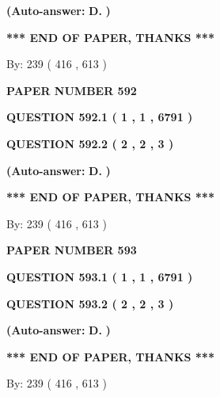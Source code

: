\documentclass[12pt]{article}
\begin{document}
 
{\textbf{(Auto-answer:}}
{\textbf{\large{
D.}}}
{\textbf{)}}
 
 
   
   
   
   
\vspace{1.0in} 
{\textbf{\large{ *** END OF PAPER, THANKS *** }}} 
   
   
\hspace{1.0in} By: 
 239 ( 416 ,  613 )
   
   
   
   
\newpage 
\setcounter{page}{ 
   592001 } 
   
   
 {\textbf{ \Large{ PAPER NUMBER  592  }}}
   
   
   
   
  
  
{\textbf{\large{QUESTION
592.1 
 ( 1 , 1 , 6791 )
}}}
  
  
{\textbf{\large{QUESTION
592.2 
 ( 2 , 2 , 3 )
}}}
 
 
{\textbf{(Auto-answer:}}
{\textbf{\large{
D.}}}
{\textbf{)}}
 
 
   
   
   
   
\vspace{1.0in} 
{\textbf{\large{ *** END OF PAPER, THANKS *** }}} 
   
   
\hspace{1.0in} By: 
 239 ( 416 ,  613 )
   
   
   
   
\newpage 
\setcounter{page}{ 
   593001 } 
   
   
 {\textbf{ \Large{ PAPER NUMBER  593  }}}
   
   
   
   
  
  
{\textbf{\large{QUESTION
593.1 
 ( 1 , 1 , 6791 )
}}}
  
  
{\textbf{\large{QUESTION
593.2 
 ( 2 , 2 , 3 )
}}}
 
 
{\textbf{(Auto-answer:}}
{\textbf{\large{
D.}}}
{\textbf{)}}
 
 
   
   
   
   
\vspace{1.0in} 
{\textbf{\large{ *** END OF PAPER, THANKS *** }}} 
   
   
\hspace{1.0in} By: 
 239 ( 416 ,  613 )
   
   
   
   
\newpage 
\setcounter{page}{ 
   594001 } 
   
\end{document}
